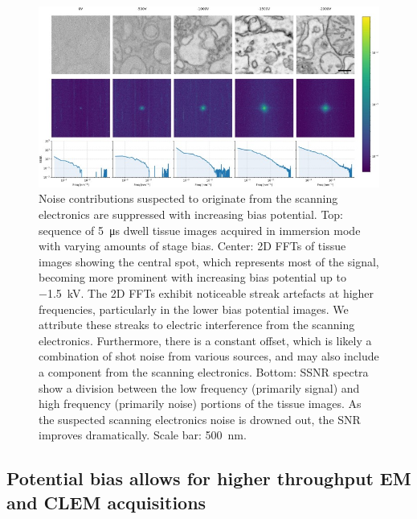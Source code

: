 \begin{figure}[!tbh]
    \centering
    \includegraphics[width=\linewidth]{chapter-2/figures_JPEG_LQ/fig2-5_noise.jpg}
    \caption{Noise contributions suspected to originate from the scanning electronics are suppressed with increasing bias potential. Top: sequence of \SI{5}{\micro\second} dwell tissue images acquired in immersion mode with varying amounts of stage bias. Center: 2D FFTs of tissue images showing the central spot, which represents most of the signal, becoming more prominent with increasing bias potential up to \SI{-1.5}{\kilo\volt}. The 2D FFTs exhibit noticeable streak artefacts at higher frequencies, particularly in the lower bias potential images. We attribute these streaks to electric interference from the scanning electronics. Furthermore, there is a constant offset, which is likely a combination of shot noise from various sources, and may also include a component from the scanning electronics. Bottom: SSNR spectra show a division between the low frequency (primarily signal) and high frequency (primarily noise) portions of the tissue images. As the suspected scanning electronics noise is drowned out, the SNR improves dramatically. Scale bar: \SI{500}{\nano\meter}.}
    \label{fig:2.5_noise}
\end{figure}


\subsection{Potential bias allows for higher throughput EM and CLEM acquisitions}

